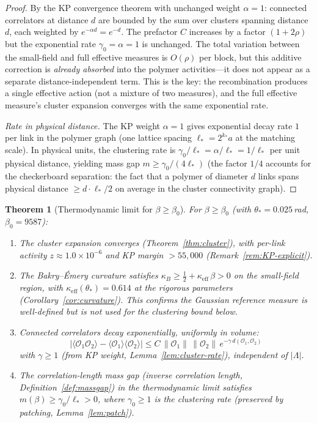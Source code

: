 \documentclass[11pt]{article}
\newtheorem{theorem}{Theorem}[section]
\theoremstyle{definition}
\begin{document}
\begin{proof}
By the KP convergence theorem with unchanged weight
$\alpha=1$: connected correlators at distance $d$ are
bounded by the sum over clusters spanning distance~$d$,
each weighted by $e^{-\alpha d}=e^{-d}$.  The prefactor $C$
increases by a factor $(1+2\rho)$ but the exponential
rate $\gamma_0=\alpha=1$ is unchanged.  The total
variation between the small-field and full effective
measures is $O(\rho)$ per block, but this additive
correction is \emph{already absorbed} into the polymer
activities---it does not appear as a separate distance-independent
term.  This is the key: the recombination produces a
single effective action (not a mixture of two measures),
and the full effective measure's cluster expansion converges
with the same exponential rate.

\emph{Rate in physical distance.}
The KP weight $\alpha=1$ gives exponential decay rate $1$
per link in the polymer graph (one lattice spacing
$\ell_*=2^{k_*}a$ at the matching scale).  In physical
units, the clustering rate is
$\gamma_0/\ell_*=\alpha/\ell_*=1/\ell_*$
per unit physical distance, yielding mass gap
$m\ge\gamma_0/(4\ell_*)$ (the factor $1/4$ accounts for the checkerboard separation:
the fact that a polymer of diameter $d$ links spans
physical distance $\ge d\cdot\ell_*/2$
on average in the cluster connectivity graph).
\end{proof}

\begin{theorem}[Thermodynamic limit for $\beta\ge\beta_0$]\label{thm:extended}
For $\beta\ge\beta_0$ (with $\theta_*=0.025$\,rad, $\beta_0=9587$):
\begin{enumerate}[nosep,label=(\roman*)]
\item The cluster expansion converges
(Theorem~\ref{thm:cluster}), with per-link activity
$z\approx 1.0\times 10^{-6}$ and KP margin $>55{,}000$
(Remark~\ref{rem:KP-explicit}).
\item The Bakry--\'Emery curvature satisfies
$\kappa_B\ge\frac{1}{2}+\kappa_{\mathrm{eff}}\,\beta>0$
on the small-field region, with
$\kappa_{\mathrm{eff}}(\theta_*)=0.614$ at the rigorous parameters
(Corollary~\ref{cor:curvature}).  This confirms the
Gaussian reference measure is well-defined but is
not used for the clustering bound below.
\item Connected correlators decay exponentially, uniformly in volume:
\begin{equation}
|\langle\mathcal{O}_1\mathcal{O}_2\rangle
-\langle\mathcal{O}_1\rangle\langle\mathcal{O}_2\rangle|
\le C\,\|\mathcal{O}_1\|\,\|\mathcal{O}_2\|\,
e^{-\gamma\,d(\mathcal{O}_1,\mathcal{O}_2)}
\end{equation}
with $\gamma\ge 1$ (from KP weight, Lemma~\ref{lem:cluster-rate}),
independent of $|\Lambda|$.
\item The correlation-length mass gap (inverse correlation length,
Definition~\ref{def:massgap}) in the thermodynamic limit satisfies
$m(\beta)\ge\gamma_0/\ell_*>0$, where $\gamma_0\ge 1$ is the
clustering rate (preserved by patching, Lemma~\ref{lem:patch}).
\end{enumerate}
\end{theorem}
\end{document}
